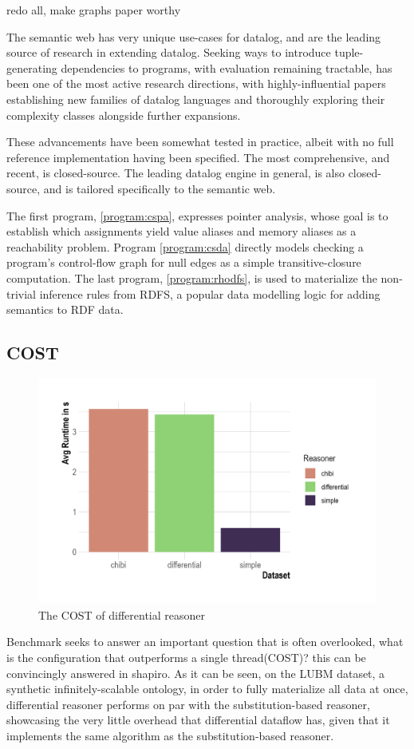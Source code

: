\documentclass[sigconf,screen,review,natbib]{acmart}
\theoremstyle{definition}
\begin{document}
redo all, make graphs paper worthy

The semantic web has very unique use-cases for datalog, and are the leading source of research in extending datalog. Seeking ways to introduce tuple-generating dependencies to
programs, with evaluation remaining tractable, has been one of the most active research directions, with highly-influential papers establishing new families of datalog
languages\cite{datalog_plus_minus} and thoroughly exploring their complexity classes alongside further expansions\cite{sticky,warded,monadic}.

These advancements have been somewhat tested in practice, albeit with no full reference implementation having been specified. The most comprehensive, and recent, is closed-source\cite{vadalog}.
The leading datalog engine in general, is also closed-source\cite{rdfox}, and is tailored specifically to the semantic web.

The first program, \ref{program:cspa}\cite{graspan}, expresses pointer analysis, whose goal is to establish which assignments yield value aliases and memory aliases as a reachability problem. Program \ref{program:csda} directly models checking a program's control-flow graph for null edges as a simple transitive-closure computation. The last program, \ref{program:rhodfs}, is used to materialize the non-trivial inference rules from RDFS\cite{rdfs}, a popular data modelling logic for adding semantics to RDF\cite{rdf} data.

\subsection{COST}

\begin{figure}[htb!]
	\centering
	\includegraphics[width=.45\textwidth,height=\textheight,keepaspectratio]{COST}
	\caption{The COST of differential reasoner}
	\label{benchmark:cost}
\end{figure}

Benchmark \cite{benchmark:cost} seeks to answer an important question that is often overlooked, what is the configuration that outperforms a single thread(COST)? this can be convincingly answered in shapiro. As it can be seen, on the LUBM dataset, a synthetic infinitely-scalable ontology, in order to fully materialize all data at once, differential reasoner performs on par with the substitution-based reasoner, showcasing the very little overhead that differential dataflow has, given that it implements the same algorithm as the substitution-based reasoner.
\end{document}
